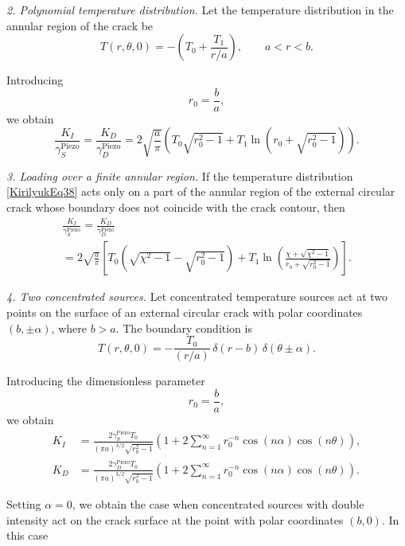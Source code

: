 \medskip
\emph{2. Polynomial temperature distribution.} Let the temperature distribution in the annular region of the crack be
\begin{equation}
	T(r,\theta,0)
	=
	-\left(
	T_0+\frac{T_1}{r/a}
	\right),
	\qquad a<r<b .
	\label{KirilyukEq38}
\end{equation}

Introducing
\[
r_0=\frac{b}{a},
\]
we obtain
\[
\frac{K_I}{\gamma_S^{\text{Piezo}}}
=
\frac{K_D}{\gamma_D^{\text{Piezo}}}
=
2\sqrt{\frac{a}{\pi}}
\left(
T_0\sqrt{r_0^{2}-1}
+
T_1\ln\!\left(r_0+\sqrt{r_0^{2}-1}\right)
\right).
\]


\medskip
\emph{3. Loading over a finite annular region.} If the temperature distribution \eqref{KirilyukEq38} acts only on a part of the annular region of the external circular crack whose boundary does not coincide with the crack contour, then
\begin{multline}
	\frac{K_I}{\gamma_S^{\text{Piezo}}}
	=
	\frac{K_D}{\gamma_D^{\text{Piezo}}}
	\\
	=
	2\sqrt{\frac{a}{\pi}}
	\left[
	T_0
	\left(
	\sqrt{\chi^{2}-1}
	-
	\sqrt{r_0^{2}-1}
	\right)
	+
	T_1
	\ln
	\left(
	\frac{\chi+\sqrt{\chi^{2}-1}}
	{r_0+\sqrt{r_0^{2}-1}}
	\right)
	\right].
	\label{KirilyukEq39}
\end{multline}

\medskip
\emph{4. Two concentrated sources.}
Let concentrated temperature sources act at two points on the surface of an external circular crack with polar coordinates $(b,\pm\alpha)$, where $b>a$. The boundary condition is
\[
T(r,\theta,0)
=
-\frac{T_0}{(r/a)}\,\delta(r-b)\,\delta(\theta\pm\alpha).
\]

Introducing the dimensionless parameter
\[
r_0=\frac{b}{a},
\]
we obtain
\begin{equation}
	\begin{aligned}
		K_I
		&=
		\frac{2\gamma_S^{\text{Piezo}}T_0}{(\pi a)^{3/2}\sqrt{r_0^2-1}}
		\left(
		1+2\sum_{n=1}^{\infty} r_0^{-n}\cos(n\alpha)\cos(n\theta)
		\right),
		\\[4pt]
		K_D
		&=
		\frac{2\gamma_D^{\text{Piezo}}T_0}{(\pi a)^{3/2}\sqrt{r_0^2-1}}
		\left(
		1+2\sum_{n=1}^{\infty} r_0^{-n}\cos(n\alpha)\cos(n\theta)
		\right).
	\end{aligned}
	\label{KirilyukEq40}
\end{equation}

\noindent
Setting $\alpha=0$, we obtain the case when concentrated sources with double intensity act on the crack surface at the point with polar coordinates $(b,0)$. In this case

